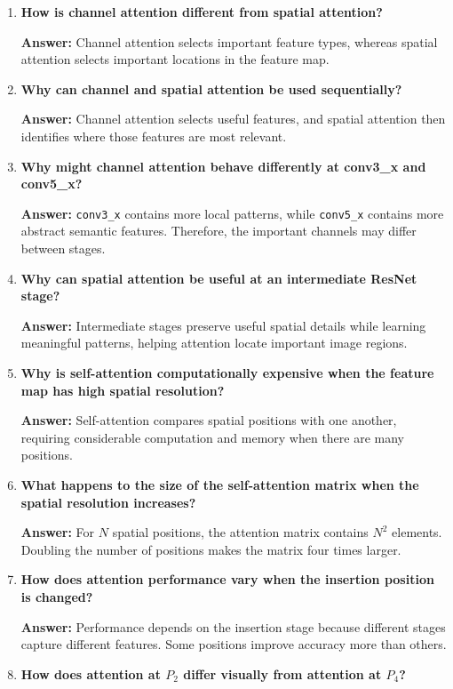 \documentclass[10pt]{article}
\begin{document}
\begin{enumerate}
\item \textbf{How is channel attention different from spatial attention?}

\textbf{Answer:} Channel attention selects important feature types, whereas spatial attention selects important locations in the feature map.

\item \textbf{Why can channel and spatial attention be used sequentially?}

\textbf{Answer:} Channel attention selects useful features, and spatial attention then identifies where those features are most relevant.

\item \textbf{Why might channel attention behave differently at conv3\_x and conv5\_x?}

\textbf{Answer:} \texttt{conv3\_x} contains more local patterns, while \texttt{conv5\_x} contains more abstract semantic features. Therefore, the important channels may differ between stages.

\item \textbf{Why can spatial attention be useful at an intermediate ResNet stage?}

\textbf{Answer:} Intermediate stages preserve useful spatial details while learning meaningful patterns, helping attention locate important image regions.

\item \textbf{Why is self-attention computationally expensive when the feature map has high spatial resolution?}

\textbf{Answer:} Self-attention compares spatial positions with one another, requiring considerable computation and memory when there are many positions.

\item \textbf{What happens to the size of the self-attention matrix when the spatial resolution increases?}

\textbf{Answer:} For $N$ spatial positions, the attention matrix contains $N^2$ elements. Doubling the number of positions makes the matrix four times larger.

\item \textbf{How does attention performance vary when the insertion position is changed?}

\textbf{Answer:} Performance depends on the insertion stage because different stages capture different features. Some positions improve accuracy more than others.

\item \textbf{How does attention at $P_2$ differ visually from attention at $P_4$?}


\end{enumerate}
\end{document}
